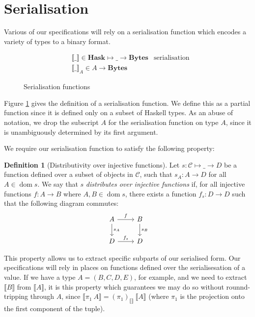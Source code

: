\documentclass[11pt,a4paper]{article}
\DeclareMathOperator{\dom}{dom}
\newcommand{\var}[1]{\mathit{#1}}
\newcommand{\bytes}{\textbf{Bytes}}
\theoremstyle{definition}
\newtheorem{definition}{Definition}[section]
\theoremstyle{remark}
\begin{document}
\section{Serialisation}
Various of our specifications will rely on a serialisation function which
encodes a variety of types to a binary format.

\begin{figure}[h]
  \label{fig:serialisation}
  \begin{align*}
    & \llbracket\_\rrbracket \in \textbf{Hask}\mapsto\_\to\bytes
    & \text{serialisation} \\
    & \llbracket\_\rrbracket_{A} \in \var{A}\to\bytes
  \end{align*}
  \caption{Serialisation functions}
\end{figure}

Figure \ref{fig:serialisation} gives the definition of a serialisation function.
We define this as a partial function since it is defined only on a subset of
Haskell types. As an abuse of notation, we drop the subscript $A$ for the
serialisation function on type $A$, since it is unambiguously determined by its
first argument.

We require our serialisation function to satisfy the following property:
\begin{definition}[Distributivity over injective functions]
  Let $s:\mathcal{C}\mapsto\_\to\var{D}$ be a function defined over a subset of
  objects in $\mathcal{C}$, such that $s_A:A\to\var{D}$ for all $A\in\dom{s}$.
  We say that $s$ \textit{distributes over injective functions} if, for all
  injective functions $f:A\to B$ where $A,B\in\dom{s}$, there exists a function
  $f_s:\var{D}\to\var{D}$ such that the following diagram commutes:
  \[
    \begin{tikzcd}
      A \arrow{r}{f} \arrow{d}{s_A} & B \arrow{d}{s_B} \\
      D \arrow{r}{f_s} & D
    \end{tikzcd}
  \]
\end{definition}

This property allows us to extract specific subparts of our serialised form. Our
specifications will rely in places on functions defined over the serialisesation
of a value. If we have a type $A=(B,C,D,E)$, for example, and we need to extract
$\llbracket\var{B}\rrbracket$ from $\llbracket\var{A}\rrbracket$, it is this
property which guarantees we may do so without rounnd-tripping through $A$,
since $\llbracket \pi_1 ~ A\rrbracket = (\pi_1)_{\llbracket\rrbracket} ~ \llbracket A
\rrbracket$ (where $\pi_1$ is the projection onto the first component of the tuple).
\end{document}
